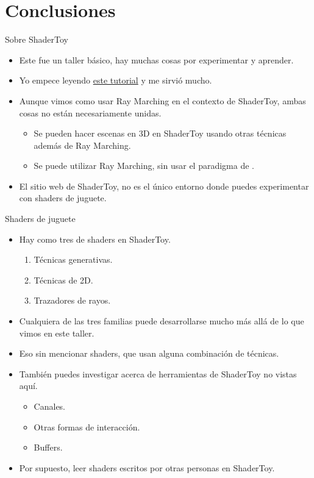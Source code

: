 \section{Conclusiones}

\begin{frame}{Sobre ShaderToy}
\begin{itemize}
    \item Este fue un taller básico, hay muchas cosas por experimentar y aprender.
    \item Yo empece leyendo \href{https://inspirnathan.com/posts/47-shadertoy-tutorial-part-1}{este tutorial} y me sirvió mucho.
    \item Aunque vimos como usar Ray Marching en el contexto de ShaderToy, ambas cosas no están necesariamente unidas.
    \begin{itemize}
        \item Se pueden hacer escenas en 3D en ShaderToy usando otras técnicas además de Ray Marching.
        \item Se puede utilizar Ray Marching, sin usar el paradigma de .
    \end{itemize}
    \item El sitio web de ShaderToy, no es el único entorno donde puedes experimentar con shaders de juguete.
\end{itemize}
\end{frame}

\begin{frame}{Shaders de juguete}
\begin{itemize}
     \item Hay como tres  de shaders en ShaderToy.
     \begin{enumerate}
        \item Técnicas generativas.
        \item Técnicas de 2D.
        \item Trazadores de rayos.         
     \end{enumerate}
     \item Cualquiera de las tres familias puede desarrollarse mucho más allá de lo que vimos en este taller.
     \item Eso sin mencionar shaders, que usan alguna combinación de técnicas.
     \item También puedes investigar acerca de herramientas de ShaderToy no vistas aquí.
     \begin{itemize}
        \item Canales.
        \item Otras formas de interacción.
        \item Buffers.
     \end{itemize}
     \item Por supuesto, leer shaders escritos por otras personas en ShaderToy.
 \end{itemize}
\end{frame}


